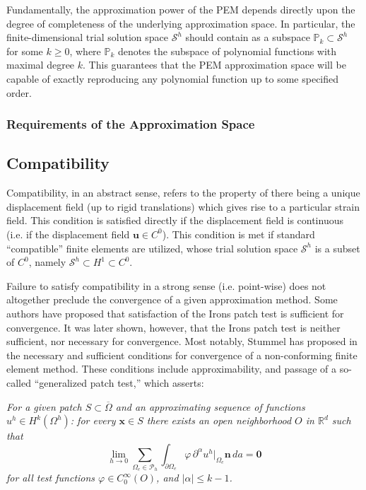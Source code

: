 Fundamentally, the approximation power of the PEM depends directly upon the degree of completeness of the underlying approximation space. In particular, the finite-dimensional trial solution space $\mathcal{S}^h$ should contain as a subspace $\mathbb{P}_k \subset \mathcal{S}^h$ for some $k \geq 0$, where $\mathbb{P}_k$ denotes the subspace of polynomial functions with maximal degree $k$. This guarantees that the PEM approximation space will be capable of exactly reproducing any polynomial function up to some specified order.

\subsubsection{Requirements of the Approximation Space}
\subsection{Compatibility}

Compatibility, in an abstract sense, refers to the property of there being a unique displacement field (up to rigid translations) which gives rise to a particular strain field. This condition is satisfied directly if the displacement field is continuous (i.e. if the displacement field $\mathbf{u} \in C^0$). This condition is met if standard ``compatible'' finite elements are utilized, whose trial solution space $\mathcal{S}^h$ is a subset of $C^0$, namely $\mathcal{S}^h \subset H^1 \subset C^0$.

Failure to satisfy compatibility in a strong sense (i.e. point-wise) does not altogether preclude the convergence of a given approximation method. Some authors have proposed that satisfaction of the Irons patch test is sufficient for convergence. It was later shown, however, that the Irons patch test is neither sufficient, nor necessary for convergence. Most notably, Stummel has proposed in \cite{Stummel:79} the necessary and sufficient conditions for convergence of a non-conforming finite element method. These conditions include approximability, and passage of a so-called ``generalized patch test,'' which asserts:

\textit{For a given patch $S \subset \overline{\Omega}$ and an approximating sequence of functions $u^h \in H^k (\Omega^h)$: for every $\mathbf{x} \in S$ there exists an open neighborhood $O$ in $\mathbb{R}^d$ such that}
\begin{equation}
  \lim_{h \rightarrow 0} \sum_{\Omega_e \in \mathcal{P}_h} \int_{\partial \Omega_e} \varphi \, \partial^\alpha u^h|_{\Omega_e} \mathbf{n} \, da = \mathbf{0}
\end{equation}
\textit{for all test functions $\varphi \in C^{\infty}_0 (O)$, and $| \alpha | \leq k-1$.}

